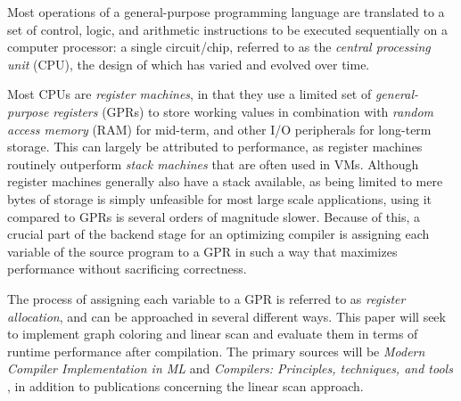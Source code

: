 \documentclass{article}
\begin{document}
Most operations of a general-purpose programming language are translated to a set of control, logic, and arithmetic instructions to be executed sequentially on a computer processor: a single circuit/chip, referred to as the \textit{central processing unit} (CPU), the design of which has varied and evolved over time.

Most CPUs are \textit{register machines}, in that they use a limited set of \textit{general-purpose registers} (GPRs) to store working values in combination with \textit{random access memory} (RAM) for mid-term, and other I/O peripherals for long-term storage. This can largely be attributed to performance, as register machines routinely outperform \textit{stack machines} \parencite{ShiYunhe2008VmsS} that are often used in VMs.
Although register machines generally also have a stack available, as being limited to mere bytes of storage is simply unfeasible for most large scale applications, using it compared to GPRs is several orders of magnitude slower.
Because of this, a crucial part of the backend stage for an optimizing compiler is assigning each variable  of the source program to a GPR in such a way that maximizes performance without sacrificing correctness.



The process of assigning each variable to a GPR is referred to as \textit{register allocation}, and can be approached in several different ways. This paper will seek to implement graph coloring and linear scan and evaluate them in terms of runtime performance after compilation. %
The primary sources will be \textit{Modern Compiler Implementation in ML} \parencite{tiger} and \textit{Compilers: Principles, techniques, and tools} \parencite{dragon}, in addition to publications concerning the linear scan approach.





\end{document}
